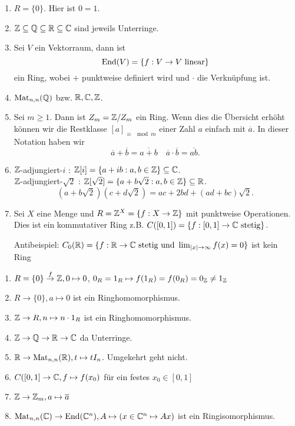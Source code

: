 \begin{eg}[Ringe]
	\begin{enumerate}[(1)]
		\item $R = \{0\}$. Hier ist $0 = 1$.
		\item $\mathbb{Z} \subseteq \mathbb{Q} \subseteq \mathbb{R} \subseteq \mathbb{C}$ sind jeweils Unterringe.
		\item Sei $V$ ein Vektorraum, dann ist
			\[
				\operatorname{End}(V) = \{f: V \to V \text{ linear}\} 
			\] 
			ein Ring, wobei $+$ punktweise definiert wird und $\cdot$ die Verknüpfung ist.
		\item $\operatorname{Mat}_{n,n}(\mathbb{Q})$ bzw. $\mathbb{R},\mathbb{C},\mathbb{Z}$.
		\item Sei $m \geq 1$. Dann ist $Z_{m} = \mathbb{Z} / Z_{m}$ ein Ring.
			Wenn dies die Übersicht erhöht können wir die Restklasse $[a]_{\equiv \mod m}$ einer Zahl $a$ einfach mit $\overline{a}$. In dieser Notation haben wir
			\[
			\overline{a}+ \overline{b} = \overline{a+b} \quad \overline{a} \cdot \overline{b} = \overline{ab}
			.\]
		\item $\mathbb{Z}$-adjungiert-$i$ : $\mathbb{Z}[i] = \{a+ib: a,b \in \mathbb{Z}\} \subseteq \mathbb{C}$.\\
			$\mathbb{Z}$-adjungiert-$\sqrt{2}$ : $\mathbb{Z}[\sqrt{2}] = \{a + b\sqrt{2} : a,b \in \mathbb{Z} \} \subseteq \mathbb{R}$.
			\[
				(a+b \sqrt{2} ) (c+d\sqrt{2} ) = ac + 2bd + (ad+bc)\sqrt{2} 
			.\] 
		\item Sei $X$ eine Menge und $R = \mathbb{Z}^{X} = \{f: X \to \mathbb{Z}\}$ mit punktweise Operationen. Dies ist ein kommutativer Ring
			z.B. $C([0,1]) = \{f: [0,1] \to \mathbb{C} \text{ stetig}\}$.

			Antibeispiel: $C_{0}(\mathbb{R}) = \{f: \mathbb{R} \to \mathbb{C} \text{ stetig und } \lim_{\abs{x} \to \infty} f(x) = 0\}$ ist kein Ring

	\end{enumerate}
\end{eg}

\begin{eg}[Ringhomomorphismen]
	\begin{enumerate}[(1)]
		\item $R = \{0\} \stackrel{f}{\to} \mathbb{Z}, 0 \mapsto 0$, $0_{R} = 1_{R} \mapsto f(1_{R}) = f(0_{R}) = 0_{\mathbb{Z}} \neq 1_{\mathbb{Z}}$
		\item $R \to \{0\}, a \mapsto 0$ ist ein Ringhomomorphismus.
		\item $\mathbb{Z} \to R, n \mapsto n\cdot 1_{R}$ ist ein Ringhomomorphismus.
		\item $\mathbb{Z} \to \mathbb{Q} \to \mathbb{R} \to \mathbb{C}$ da Unterringe.
		\item $\mathbb{R} \to \operatorname{Mat}_{n,n}(\mathbb{R}), t \mapsto t I_{n}$. Umgekehrt geht nicht.
		\item $C([0,1] \to \mathbb{C}, f \mapsto f(x_0)$ für ein festes $x_0 \in [0,1]$ 
		\item $\mathbb{Z} \to \mathbb{Z}_{m}, a \mapsto \overline{a}$
		\item $\operatorname{Mat}_{n,n}(\mathbb{C}) \to \operatorname{End}(\mathbb{C}^{n}), A \mapsto (x \in \mathbb{C}^{n} \mapsto A x)$ ist ein Ringisomorphismus.
	\end{enumerate}
\end{eg}

